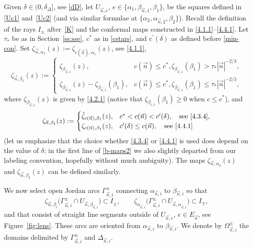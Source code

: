 \documentclass[10pt,a4paper]{amsart}
\numberwithin{equation}{section}
\newcommand{\n}{{\vec n}}
\begin{document}
Given $ \delta\in(0,\delta_\Delta] $, see \eqref{dD}, let $ U_{\n,e} $, $ e\in \{\alpha_1,\beta_{\n,1},\beta_1\} $, be the squares defined in \eqref{Uc1} and~\eqref{Uc2} (and via similar formulae at $ \{\alpha_2,\alpha_{\n,2},\beta_2\} $). Recall the definition of the rays $ I_\pm $ after~\eqref{K} and the conformal maps constructed in \eqref{4.1.1}--\eqref{4.4.1}. Let $ \tau_* $ be as in Section~\ref{ss:sse}, $ c^* $ as in \eqref{cstars}, and $ c^\prime(\delta) $ as defined before \eqref{min-con}. Set $ \zeta_{\n,\alpha_1}(z) := \zeta_{c(\n),\alpha_1}(z) $, see \eqref{4.1.1},
\begin{equation}
\zeta_{\n,\beta_1}(z) :=
\begin{cases}
\zeta_{\beta_{\n,1}}(z), & c(\n) \leq c^*, \zeta_{\beta_{\n,1}}(\beta_1)>\tau_*|\n|^{-2/3}, \\
\zeta_{\beta_{\n,1}}(z)-\zeta_{\beta_{\n,1}}(\beta_1), & c(\n)\leq c^*, \zeta_{\beta_{\n,1}}(\beta_1)\leq \tau_*|\n|^{-2/3},
\end{cases}
\label{b-maps1}
\end{equation}
where $ \zeta_{\beta_{\n,1}}(z) $ is given by \eqref{4.2.1} (notice that $ \zeta_{\beta_{c,1}}(\beta_1)\geq0 $ when $ c\leq c^*$), and
\begin{equation}
\zeta_{\n,\beta_1}(z) :=
\begin{cases}
\hat\zeta_{c(\n),\beta_1}(z), & c^*<c(\n)<c^\prime(\delta), \quad \text{see} \ \eqref{4.3.4}, \\
\zeta_{c(\n),\beta_1}(z), & c^\prime(\delta) \leq c(\n), \quad \text{see} \ \eqref{4.4.1}
\end{cases}
\label{b-maps2}
\end{equation}
(let us emphasize that the choice whether \eqref{4.3.4} or \eqref{4.4.1} is used does depend on the value of $ \delta $; in the first line of \eqref{b-maps2} we also slightly departed from our labeling convention, hopefully without much ambiguity). The maps $ \zeta_{\n,\alpha_2}(z) $ and $ \zeta_{\n,\beta_2}(z) $ can be defined similarly.

We now select open Jordan arcs $ \Gamma_{\n,i}^\pm $ connecting $ \alpha_{\n,i} $ to $ \beta_{\n,i} $ so that
\begin{equation}
\label{Ipm}
\zeta_{\n,\beta_i}\bigl(\Gamma_{\n,i}^\pm\cap U_{\n,\beta_{\n,i}}\bigr) \subset I_\pm, \qquad \zeta_{\alpha_{\n,i}}\bigl(\Gamma_{\n,i}^\pm\cap U_{\n,\alpha_{\n,i}}\bigr) \subset I_\mp,
\end{equation}
and that consist of straight line segments outside of $ U_{\n,e} $, $ e\in E_\n $, see Figure~\ref{fig:lens}. These arcs are oriented from $ \alpha_{\n,i} $ to $ \beta_{\n,i} $. We denote by $ \Omega_{\n,i}^\pm $ the domains delimited by $ \Gamma_{\n,i}^\pm $ and $ \Delta_{\n,i} $.
\end{document}
